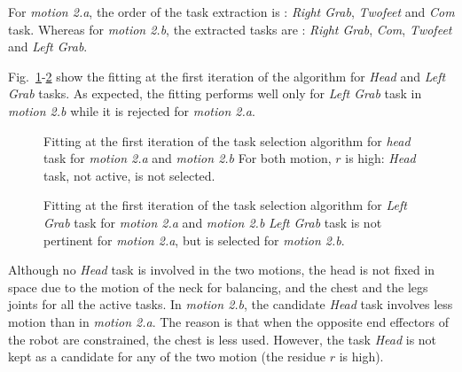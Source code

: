 \documentclass[journal]{IEEEtran}
\begin{document}
For \emph{motion 2.a}, the order of the task extraction is :
\emph{Right Grab}, \emph{Twofeet} and \emph{Com} task.
Whereas for \emph{motion 2.b},
the extracted tasks are : \emph{Right Grab},  \emph{Com}, \emph{Twofeet} and \emph{Left Grab}.

Fig.~\ref{fig:exp1:headFit}-\ref{fig:exp1:taskLhand} show the
fitting at the first iteration of the algorithm for \emph{Head} and \emph{Left Grab} tasks. As expected,
the fitting performs well only for \emph{Left Grab} task in \emph{motion 2.b} while it is rejected for
\emph{motion 2.a}.
\begin{figure}[hp]
  \centering
  \subfigure[Motion 2.a]{
  \resizebox{.48\textwidth}{!} {
  
  }
  \label{fig:exp1:headFit:R}
  }
  \subfigure[Motion 2.b]{
  \resizebox{.48\textwidth}{!} {
  
  }
  \label{fig:exp1:headFit:RL}
  }
  \caption{Fitting at the first iteration of the task selection algorithm
  for \emph{head} task for \emph{motion 2.a} and \emph{motion 2.b} 
  For both motion, $r$ is high: \emph{Head} task, not active, is not selected.}
  \label{fig:exp1:headFit}
\end{figure}
\begin{figure}[hp]
  \centering
  \subfigure[Motion 2.a]{
  \resizebox{.48\textwidth}{!} {
  
  }                           
  \label{fig:exp1:taskLhand:R}
  }
  \subfigure[Motion 2.b]{
  \resizebox{.48\textwidth}{!} {
  
  }
  \label{fig:exp1:taskLhand:RL}
  }
  \caption{Fitting at the first iteration of the task selection algorithm
  for \emph{Left Grab} task for \emph{motion 2.a} and \emph{motion 2.b} 
  \emph{Left Grab} task is not pertinent for \emph{motion 2.a}, but is selected for \emph{motion 2.b}.}
  \label{fig:exp1:taskLhand}
\end{figure}

Although no \emph{Head} task is involved in the two motions, the head is not 
fixed in space due to the motion of the neck for balancing, and the chest and the legs
joints for all the active tasks.
In \emph{motion 2.b}, the candidate \emph{Head} task involves less motion
than in \emph{motion 2.a}. The reason is that when the opposite end effectors
of the robot are constrained, the chest is less used.
However, the task \emph{Head} is not kept as a candidate for any of the two motion (the residue $r$ is high).
\end{document}
